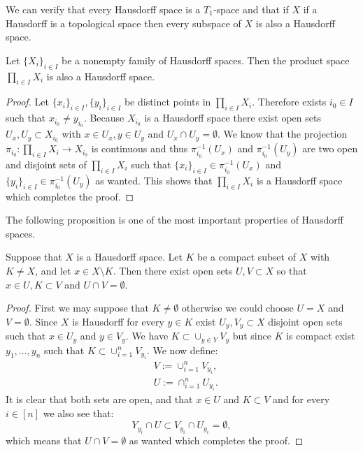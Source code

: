 \documentclass[11pt,a4paper]{article}
\begin{document}
\begin{remark}
  We can verify that every Hausdorff space is a $T_1$-space and that if
  $X$ if a Hausdorff is a topological space then every subspace of $X$
  is also a Hausdorff space.
\end{remark}

\begin{proposition}
  Let $\{X_i\}_{i \in I}$ be a nonempty family of Hausdorff spaces. 
  Then the product space $\prod_{i \in I}{X_i}$ is also a Hausdorff 
  space.
\end{proposition}
\begin{proof}
  Let $\{x_i\}_{i \in I}, \{y_i\}_{i \in I}$ be distinct points
  in $\prod_{i \in I}{X_i}$. Therefore exists $i_0 \in I$ such that
  $x_{i_0} \neq y_{i_0}$. Because $X_{i_0}$ is a Hausdorff space 
  there exist open sets $U_x, U_y \subset X_{i_0}$ with 
  $x \in U_x, y \in U_y$ and $U_x \cap U_y = \emptyset$. We know that
  the projection $\pi_{i_0} \colon \prod_{i \in I}{X_i} \to X_{i_0}$
  is continuous and thus $\pi_{i_0}^{-1}(U_x)$ and $\pi_{i_0}^{-1}(U_y)$
  are two open and disjoint sets of $\prod_{i \in I}{X_i}$ such
  that $\{x_i\}_{i \in I} \in \pi_{i_0}^{-1}(U_x)$ and 
  $\{y_i\}_{i \in I} \in \pi_{i_0}^{-1}(U_y)$ as wanted. This shows
  that $\prod_{i \in I}{X_i}$ is a Hausdorff space which completes
  the proof.
\end{proof}

\begin{remark}
  The following proposition is one of the most important properties of
  Hausdorff spaces.
\end{remark}

\begin{proposition}
  Suppose that $X$ is a Hausdorff space. Let $K$ be a compact subset
  of $X$ with $K \neq X$, and let $x \in X \setminus K$. Then there 	
  exist open sets $U, V \subset X$ so that $x \in U , K \subset V$ 
  and $U \cap V = \emptyset$.
\end{proposition}
\begin{proof}
  First we may suppose that $K \neq \emptyset$ otherwise we could
  choose $U = X$ and $V = \emptyset$. Since $X$ is Hausdorff for
  every $y \in K$ exist $U_y, V_y \subset X$ disjoint open sets 
  such that $x \in U_y$ and $y \in V_y$. We have 
  $K \subset \cup_{y \in Y}{V_y}$ but since $K$ is compact exist
  $y_1,\dots,y_n$ such that $K \subset \cup_{i=1}^{n}{V_{y_i}}$.
  We now define:
  \begin{align*}
    &V := \cup_{i=1}^{n}{V_{y_i}}, \\
    &U := \cap_{i=1}^{n}{U_{y_i}}.
  \end{align*}
  It is clear that both sets are open, and that $x \in U$ and
  $K \subset V$ and for every $i \in [n]$ we also see that:
  \[
    Y_{y_i} \cap U \subset V_{y_i} \cap U_{y_i} = \emptyset,
  \]
  which means that $U \cap V = \emptyset$ as wanted which completes
  the proof.
\end{proof}
\end{document}
